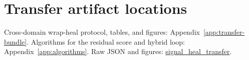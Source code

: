 
\section{Transfer artifact locations}
\label{app:transfer-pilot}

Cross-domain wrap-heal protocol, tables, and figures:
Appendix~\ref{app:transfer-bundle}.
Algorithms for the residual score and hybrid loop: Appendix~\ref{app:algorithms}.
Raw JSON and figures:
\href{https://github.com/reeldemo/reelsynth/tree/main/brand/artifacts/signal_heal_transfer}{signal\_heal\_transfer}.

